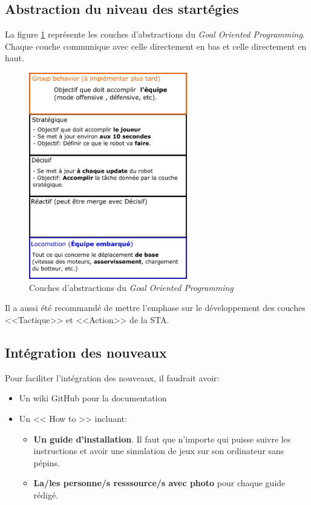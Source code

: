 \documentclass[12pt,letterpaper,twoside]{article}
\begin{document}
\subsection*{Abstraction du niveau des startégies}
La figure \ref{fig:gpo} représente les couches d'abstractions du \textit{Goal Oriented Programming}.
Chaque couche communique avec celle directement en bas et celle directement en haut.

\begin{figure}[htp]
\label{fig:gpo}
\centering
\includegraphics[height=9cm,keepaspectratio]{gpo_couches.png}
\caption{Couches d'abstractions du \textit{Goal Oriented Programming}}
\end{figure}

Il a aussi été recommandé de mettre l'emphase sur le développement des couches <<Tactique>> et <<Action>> de la STA.

\subsection*{Intégration des nouveaux}
Pour faciliter l'intégration des nouveaux, il faudrait avoir:
\begin{itemize}
\item Un wiki GitHub pour la documentation
\item Un << How to >> incluant:
\begin{itemize}
\item \textbf{Un guide d'installation}.
Il faut que n'importe qui puisse suivre les instructions et avoir une simulation de jeux sur son ordinateur sans pépins.
\item \textbf{La/les personne/s resssource/s avec photo} pour chaque guide rédigé.
\end{itemize}
\end{itemize}
\end{document}
